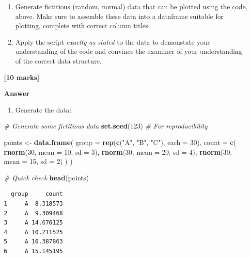 \documentclass[
  10t,
]{article}
\newenvironment{Shaded}{\begin{snugshade}}{\end{snugshade}}
\newcommand{\AttributeTok}[1]{\textcolor[rgb]{0.13,0.29,0.53}{#1}}
\newcommand{\CommentTok}[1]{\textcolor[rgb]{0.56,0.35,0.01}{\textit{#1}}}
\newcommand{\DecValTok}[1]{\textcolor[rgb]{0.00,0.00,0.81}{#1}}
\newcommand{\FunctionTok}[1]{\textcolor[rgb]{0.13,0.29,0.53}{\textbf{#1}}}
\newcommand{\NormalTok}[1]{#1}
\newcommand{\OtherTok}[1]{\textcolor[rgb]{0.56,0.35,0.01}{#1}}
\newcommand{\StringTok}[1]{\textcolor[rgb]{0.31,0.60,0.02}{#1}}
\providecommand{\tightlist}{%
  \setlength{\itemsep}{0pt}\setlength{\parskip}{0pt}}
\begin{document}
\begin{enumerate}
\def\labelenumi{\alph{enumi}.}
\tightlist
\item
  Generate fictitious (random, normal) data that can be plotted using
  the code, above. Make sure to assemble these data into a dataframe
  suitable for plotting, complete with correct column titles.
\item
  Apply the script \emph{exactly as stated} to the data to demonstate
  your understanding of the code and convince the examiner of your
  understanding of the correct data structure.
\end{enumerate}

\textbf{{[}10 marks{]}}

\textbf{Answer}

\begin{enumerate}
\def\labelenumi{\alph{enumi}.}
\tightlist
\item
  Generate the data:
\end{enumerate}

\begin{Shaded}
\begin{Highlighting}[]
\CommentTok{\# Generate some fictitious data}
\FunctionTok{set.seed}\NormalTok{(}\DecValTok{123}\NormalTok{)  }\CommentTok{\# For reproducibility}

\NormalTok{points }\OtherTok{\textless{}{-}} \FunctionTok{data.frame}\NormalTok{(}
  \AttributeTok{group =} \FunctionTok{rep}\NormalTok{(}\FunctionTok{c}\NormalTok{(}\StringTok{"A"}\NormalTok{, }\StringTok{"B"}\NormalTok{, }\StringTok{"C"}\NormalTok{), }\AttributeTok{each =} \DecValTok{30}\NormalTok{),}
  \AttributeTok{count =} \FunctionTok{c}\NormalTok{(}
    \FunctionTok{rnorm}\NormalTok{(}\DecValTok{30}\NormalTok{, }\AttributeTok{mean =} \DecValTok{10}\NormalTok{, }\AttributeTok{sd =} \DecValTok{3}\NormalTok{),}
    \FunctionTok{rnorm}\NormalTok{(}\DecValTok{30}\NormalTok{, }\AttributeTok{mean =} \DecValTok{20}\NormalTok{, }\AttributeTok{sd =} \DecValTok{4}\NormalTok{),}
    \FunctionTok{rnorm}\NormalTok{(}\DecValTok{30}\NormalTok{, }\AttributeTok{mean =} \DecValTok{15}\NormalTok{, }\AttributeTok{sd =} \DecValTok{2}\NormalTok{)}
\NormalTok{  )}
\NormalTok{)}

\CommentTok{\# Quick check}
\FunctionTok{head}\NormalTok{(points)}
\end{Highlighting}
\end{Shaded}

\begin{verbatim}
  group     count
1     A  8.318573
2     A  9.309468
3     A 14.676125
4     A 10.211525
5     A 10.387863
6     A 15.145195
\end{verbatim}
\end{document}
